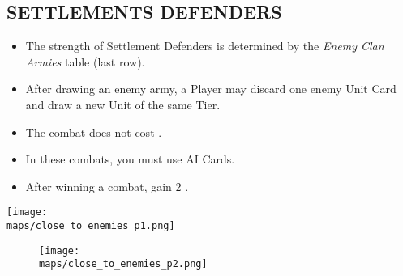 \begin{multicols}{2}
\subsection*{\MakeUppercase{Settlements Defenders}}
\begin{itemize}
  \item The strength of Settlement Defenders is determined by the \textit{Enemy Clan Armies} table (last row).
  \item After drawing an enemy army, a Player may discard one enemy Unit Card and draw a new Unit of the same Tier.
  \item The combat does not cost .
  \item In these combats, you must use AI Cards.
  \item After winning a combat, gain 2 .
\end{itemize}

\columnbreak

\vspace*{\fill}
\begin{center}
  \texttt{[image: \\maps/close\_to\_enemies\_p1.png]}
\end{center}
\vspace*{\fill}

\end{multicols}

\begin{figure}[h!]
  \centering
  \texttt{[image: \\maps/close\_to\_enemies\_p2.png]}
\end{figure}


